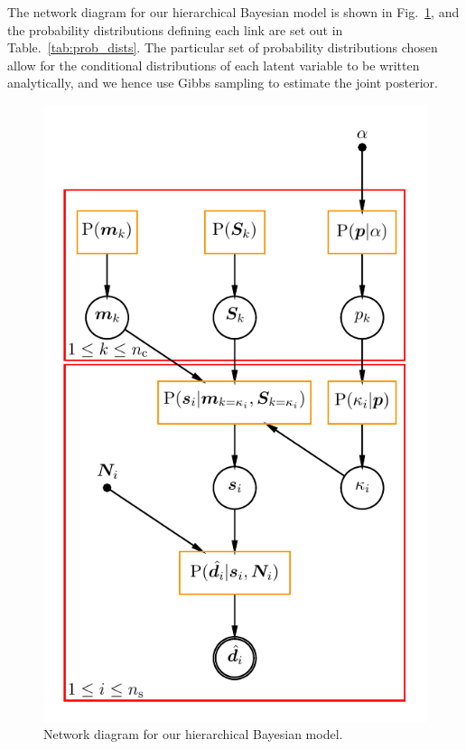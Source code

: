 \documentclass[a4paper,fleqn,usenatbib]{mnras}
\begin{document}
The network diagram for our hierarchical Bayesian model is shown in Fig.~\ref{fig:network_diagram}, and the probability distributions defining each link are set out in Table.~\ref{tab:prob_dists}. The particular set of probability distributions chosen allow for the conditional distributions of each latent variable to be written analytically, and we hence use Gibbs sampling to estimate the joint posterior.

\begin{figure}
	\includegraphics[width=\columnwidth]{bhm_plot.pdf}
    \caption{Network diagram for our hierarchical Bayesian model.}
    \label{fig:network_diagram}
\end{figure}
\end{document}
